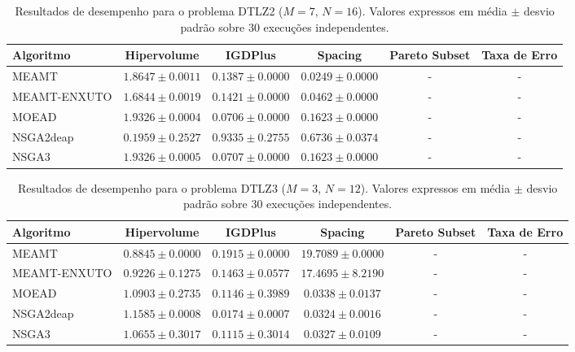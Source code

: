 \begin{table}[htpb]
\centering
\caption{Resultados de desempenho para o problema DTLZ2 ($M=7$, $N=16$). Valores expressos em média $\pm$ desvio padrão sobre 30 execuções independentes.}
\label{tab:DTLZ2_M7_N16}
\begin{tabular}{lccccc}
\hline\hline
Algoritmo & Hipervolume & IGDPlus & Spacing & Pareto Subset & Taxa de Erro \\
\hline
MEAMT & $1.8647 \pm 0.0011$ & $0.1387 \pm 0.0000$ & $0.0249 \pm 0.0000$ & - & - \\
MEAMT-ENXUTO & $1.6844 \pm 0.0019$ & $0.1421 \pm 0.0000$ & $0.0462 \pm 0.0000$ & - & - \\
MOEAD & $1.9326 \pm 0.0004$ & $0.0706 \pm 0.0000$ & $0.1623 \pm 0.0000$ & - & - \\
NSGA2deap & $0.1959 \pm 0.2527$ & $0.9335 \pm 0.2755$ & $0.6736 \pm 0.0374$ & - & - \\
NSGA3 & $1.9326 \pm 0.0005$ & $0.0707 \pm 0.0000$ & $0.1623 \pm 0.0000$ & - & - \\
\hline\hline
\end{tabular}
\end{table}

\begin{table}[htpb]
\centering
\caption{Resultados de desempenho para o problema DTLZ3 ($M=3$, $N=12$). Valores expressos em média $\pm$ desvio padrão sobre 30 execuções independentes.}
\label{tab:DTLZ3_M3_N12}
\begin{tabular}{lccccc}
\hline\hline
Algoritmo & Hipervolume & IGDPlus & Spacing & Pareto Subset & Taxa de Erro \\
\hline
MEAMT & $0.8845 \pm 0.0000$ & $0.1915 \pm 0.0000$ & $19.7089 \pm 0.0000$ & - & - \\
MEAMT-ENXUTO & $0.9226 \pm 0.1275$ & $0.1463 \pm 0.0577$ & $17.4695 \pm 8.2190$ & - & - \\
MOEAD & $1.0903 \pm 0.2735$ & $0.1146 \pm 0.3989$ & $0.0338 \pm 0.0137$ & - & - \\
NSGA2deap & $1.1585 \pm 0.0008$ & $0.0174 \pm 0.0007$ & $0.0324 \pm 0.0016$ & - & - \\
NSGA3 & $1.0655 \pm 0.3017$ & $0.1115 \pm 0.3014$ & $0.0327 \pm 0.0109$ & - & - \\
\hline\hline
\end{tabular}
\end{table}

